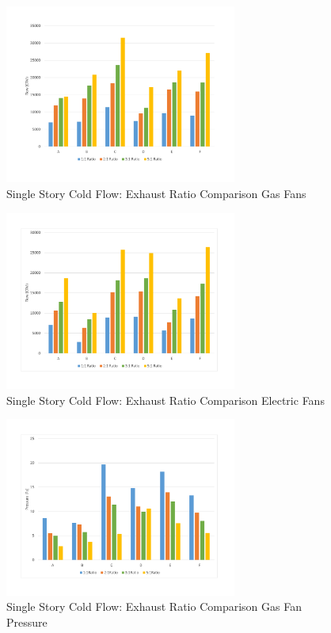 \documentclass{article}
\begin{document}
	\begin{figure} [H]
		\centering
		\includegraphics[width=3in]{0_Images/ColdFlow/Single_Story/Ratio_Comparison_Gas.pdf}
		\caption{Single Story Cold Flow: Exhaust Ratio Comparison Gas Fans}
		\label{fig:RatioExhaustCompGas}
	\end{figure}

	\begin{figure} [H]
		\centering
		\includegraphics[width=3in]{0_Images/ColdFlow/Single_Story/Ratio_Comparison_Electric.pdf}
		\caption{Single Story Cold Flow: Exhaust Ratio Comparison Electric Fans}
		\label{fig:RatioExhaustCompEle}
	\end{figure}

	\begin{figure} [H]
		\centering
		\includegraphics[width=3in]{0_Images/ColdFlow/Single_Story/Ratio_Pressure_Dining.pdf}
		\caption{Single Story Cold Flow: Exhaust Ratio Comparison Gas Fan Pressure}
		\label{fig:Ratio_Pressure_Gas}
	\end{figure}
\end{document}
